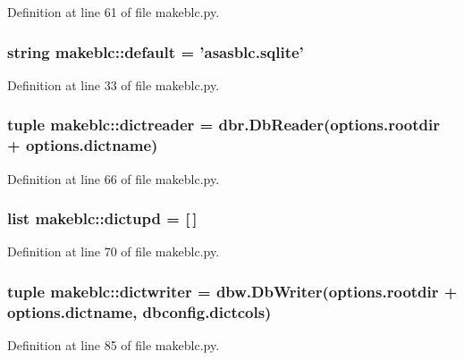 Definition at line 61 of file makeblc.py.

\hypertarget{namespacemakeblc_a65838550e6d468b9df26e64e07388457}{
\subsubsection[{default}]{\setlength{\rightskip}{0pt plus 5cm}string {\bf makeblc::default} = 'asasblc.sqlite'}}
\label{namespacemakeblc_a65838550e6d468b9df26e64e07388457}


Definition at line 33 of file makeblc.py.

\hypertarget{namespacemakeblc_a076cfa54febea93ec0a0367d9766b59b}{
\subsubsection[{dictreader}]{\setlength{\rightskip}{0pt plus 5cm}tuple {\bf makeblc::dictreader} = dbr.DbReader(options.rootdir + options.dictname)}}
\label{namespacemakeblc_a076cfa54febea93ec0a0367d9766b59b}


Definition at line 66 of file makeblc.py.

\hypertarget{namespacemakeblc_aaf2dbaa320a13bde9a473d47104f7cb4}{
\subsubsection[{dictupd}]{\setlength{\rightskip}{0pt plus 5cm}list {\bf makeblc::dictupd} = \mbox{[}$\,$\mbox{]}}}
\label{namespacemakeblc_aaf2dbaa320a13bde9a473d47104f7cb4}


Definition at line 70 of file makeblc.py.

\hypertarget{namespacemakeblc_a9cc6d5510f03009615ff8d73f8823bfd}{
\subsubsection[{dictwriter}]{\setlength{\rightskip}{0pt plus 5cm}tuple {\bf makeblc::dictwriter} = dbw.DbWriter(options.rootdir + options.dictname, dbconfig.dictcols)}}
\label{namespacemakeblc_a9cc6d5510f03009615ff8d73f8823bfd}


Definition at line 85 of file makeblc.py.

